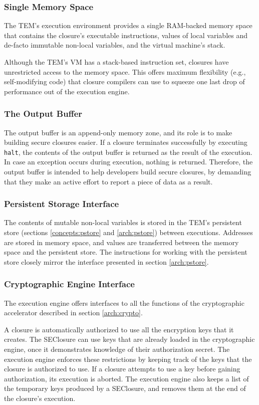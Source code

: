 \subsubsection{Single Memory Space}
The TEM's execution environment provides a single RAM-backed memory space that
contains the closure's executable instructions, values of local variables and de-facto
immutable non-local variables, and the virtual machine's stack.

Although the TEM's VM has a stack-based instruction set, closures have
unrestricted access to the memory space. This offers maximum flexibility (e.g.,
self-modifying code) that closure compilers can use to squeeze one last drop
of performance out of the execution engine.

\subsubsection{The Output Buffer}
The output buffer is an append-only memory zone, and its role is to make
building secure closures easier. If a closure terminates successfully by
executing \texttt{halt}, the contents of the output buffer is returned as the
result of the execution. In case an exception occurs during execution, nothing
is returned. Therefore, the output buffer is intended to help developers build
secure closures, by demanding that they make an active effort to report a piece
of data as a result.

\subsubsection{Persistent Storage Interface}
The contents of mutable non-local variables is stored in the TEM's persistent
store (sections \ref{concepts:pstore} and \ref{arch:pstore}) between
executions. Addresses are stored in memory space, and values are transferred
between the memory space and the persistent store. The instructions for working
with the persistent store closely mirror the interface presented in
section \ref{arch:pstore}.

\subsubsection{Cryptographic Engine Interface}
The execution engine offers interfaces to all the functions of the
cryptographic accelerator described in section \ref{arch:crypto}.

A closure is automatically authorized to use all the encryption keys that it
creates. The SEClosure can use keys that are already loaded in the cryptographic
engine, once it demonstrates knowledge of their authorization secret. The
execution engine enforces these restrictions by keeping track of the keys that
the closure is authorized to use. If a closure attempts to use a key before
gaining authorization, its execution is aborted. The execution engine
also keeps a list of the temporary keys produced by a SEClosure, and removes them at the end of the closure's execution.

